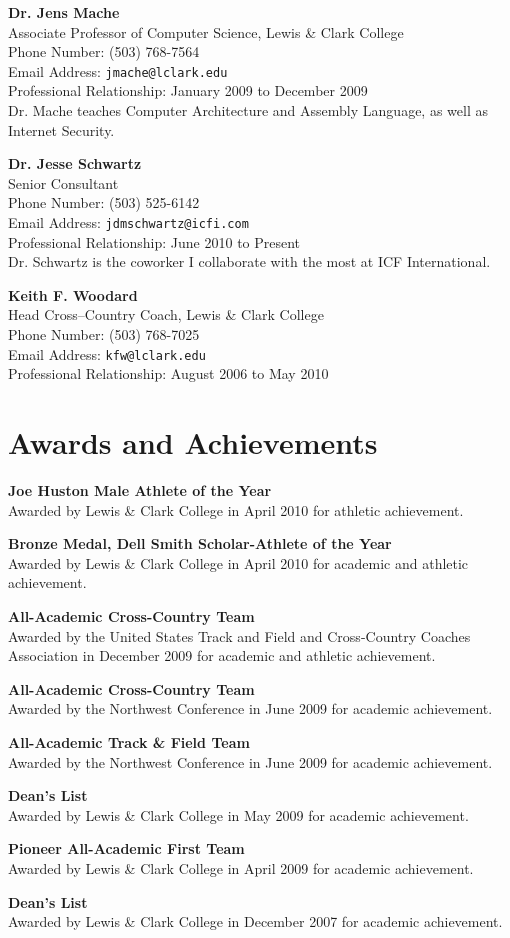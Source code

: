 \documentclass{res}
\newcommand{\reference}[6]{\textbf{#1}\\#2\\Phone Number: #3\\Email Address:
\texttt{#4}\\Professional Relationship: #5\\#6}
\begin{document}
\begin{resume}
	\reference{Dr. Jens Mache}
    {Associate Professor of Computer Science, Lewis \& Clark College}
    {(503) 768-7564}
    {jmache@lclark.edu}
    {January 2009 to December 2009}
    {Dr. Mache teaches Computer Architecture and Assembly Language, as well as
    Internet Security.}

    \reference{Dr. Jesse Schwartz}
    {Senior Consultant}
    {(503) 525-6142}
    {jdmschwartz@icfi.com}
    {June 2010 to Present}
    {Dr. Schwartz is the coworker I collaborate with the most at ICF
    International.}

	\reference{Keith F. Woodard}
    {Head Cross--Country Coach, Lewis \& Clark College}
    {(503) 768-7025}
    {kfw@lclark.edu}
    {August 2006 to May 2010}

\section{Awards and Achievements}
    \textbf{Joe Huston Male Athlete of the Year}\\
    Awarded by Lewis \& Clark College in April 2010 for athletic achievement.

    \textbf{Bronze Medal, Dell Smith Scholar-Athlete of the Year}\\
    Awarded by Lewis \& Clark College in April 2010 for academic and athletic
    achievement.

    \textbf{All-Academic Cross-Country Team}\\
    Awarded by the United States Track and Field and Cross-Country Coaches
    Association in December 2009 for academic and athletic achievement.

    \textbf{All-Academic Cross-Country Team}\\
    Awarded by the Northwest Conference in June 2009 for academic achievement.
 
    \textbf{All-Academic Track \& Field Team}\\
    Awarded by the Northwest Conference in June 2009 for academic achievement.
 
    \textbf{Dean's List}\\
    Awarded by Lewis \& Clark College in May 2009 for academic achievement.
 
    \textbf{Pioneer All-Academic First Team}\\
    Awarded by Lewis \& Clark College in April 2009 for academic achievement.
 
    \textbf{Dean's List}\\
    Awarded by Lewis \& Clark College in December 2007 for academic achievement.


\end{resume}
\end{document}
